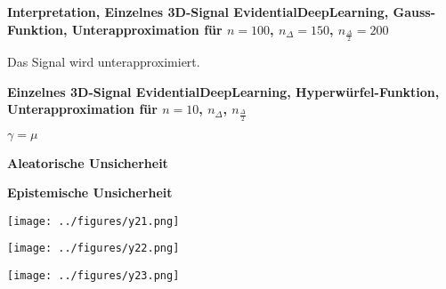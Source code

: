 \begin{otherlanguage}{ngerman}
\begin{samepage}
\begin{minipage}{\textwidth}

\noindent\textbf{Interpretation, Einzelnes 3D-Signal \gls{EvidentialDeepLearning}, Gauss-Funktion,
Unterapproximation für $n=100$, $n_{\Delta}=150$, $n_{\frac{\Delta}{2}}=200$}

Das Signal wird unterapproximiert.

\end{minipage}
\end{samepage}



\clearpage


\begin{samepage}
\begin{minipage}{\textwidth}

\noindent\textbf{Einzelnes 3D-Signal \gls{EvidentialDeepLearning}, Hyperwürfel-Funktion,
Unterapproximation für $n=10$, $n_{\Delta}$, $n_{\frac{\Delta}{2}}$}


\begin{minipage}{0.05\textwidth}\vspace{0.5cm}\end{minipage}%
\begin{minipage}{0.3\textwidth}\centering \textbf{$\gamma=\mu$}\end{minipage}%
\begin{minipage}{0.3\textwidth}\centering \textbf{Aleatorische Unsicherheit}\end{minipage}%
\begin{minipage}{0.3\textwidth}\centering \textbf{Epistemische Unsicherheit}\end{minipage}

\vspace{0.125cm}

\begin{minipage}{0.05\textwidth}\centering{}\end{minipage}%
\begin{minipage}{0.3\textwidth}\centering\texttt{[image: ../figures/y21.png]}\end{minipage}%
\begin{minipage}{0.3\textwidth}\centering\texttt{[image: ../figures/y22.png]}\end{minipage}%
\begin{minipage}{0.3\textwidth}\centering\texttt{[image: ../figures/y23.png]}\end{minipage}


\end{minipage}
\end{samepage}
\end{otherlanguage}
